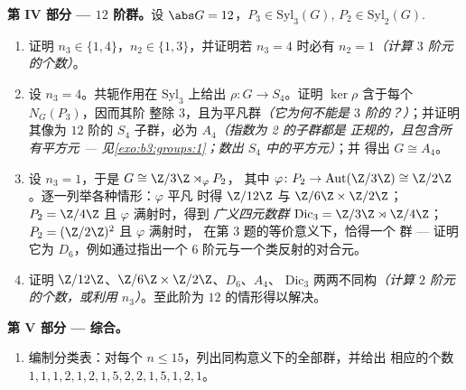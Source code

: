 \begin{problem}
\medskip
\noindent\textbf{第 IV 部分 --- $12$ 阶群。}设 $\abs G = 12$，$P_3
\in \mathrm{Syl}_3(G)$, $P_2 \in \mathrm{Syl}_2(G)$.
\begin{enumerate}[resume]
  \item 证明 $n_3 \in \{1, 4\}$，$n_2 \in \{1, 3\}$，并证明若 $n_3
        = 4$ 时必有 $n_2 = 1$\emph{（计算
        $3$ 阶元的个数）}。
  \item 设 $n_3 = 4$。共轭作用在
        $\mathrm{Syl}_3$ 上给出 $\rho \colon G \to S_4$。证明
        $\ker \rho$ 含于每个 $N_G(P_3)$，因而其阶
        整除 $3$，且为平凡群\emph{（它为何不能是
        $3$ 阶的？）}；并证明其像为 $12$ 阶的
        $S_4$ 子群，必为 $A_4$\emph{（指数为 2 的子群都是
        正规的，且包含所有平方元 ---
        见\cref{exo:b3:groups:1}；数出 $S_4$ 中的平方元）}；并
        得出 $G \cong A_4$。
  \item 设 $n_3 = 1$，于是 $G \cong \Z/3\Z \rtimes_\varphi P_2$，
        其中 $\varphi \colon P_2 \to \operatorname{Aut}(\Z/3\Z)
        \cong \Z/2\Z$。逐一列举各种情形：$\varphi$ 平凡
        时得 $\Z/12\Z$ 与 $\Z/6\Z \times \Z/2\Z$；$P_2 =
        \Z/4\Z$ 且 $\varphi$ 满射时，得到
        \emph{广义四元数群} $\mathrm{Dic}_3 = \Z/3\Z \rtimes
        \Z/4\Z$；$P_2 = (\Z/2\Z)^2$ 且 $\varphi$ 满射时，
        在第 3 题的等价意义下，恰得一个
        群 --- 证明它为 $D_6$，例如通过指出一个
        $6$ 阶元与一个类反射的对合元。
  \item 证明 $\Z/12\Z$、$\Z/6\Z \times \Z/2\Z$、$D_6$、$A_4$、
        $\mathrm{Dic}_3$ 两两不同构\emph{（计算
        $2$ 阶元的个数，或利用 $n_3$）}。至此阶为
        $12$ 的情形得以解决。
\end{enumerate}

\medskip
\noindent\textbf{第 V 部分 --- 综合。}
\begin{enumerate}[resume]
  \item 编制分类表：对每个 $n \leq
        15$，列出同构意义下的全部群，并给出
        相应的个数 $1, 1, 1, 2, 1, 2, 1, 5, 2, 2, 1, 5, 1, 2, 1$。
\end{enumerate}


\end{problem}
